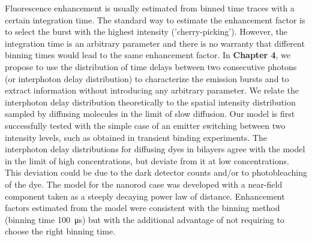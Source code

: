 Fluorescence enhancement is usually estimated from binned time traces with a certain integration time.
The standard way to estimate the enhancement factor is to select the burst with the highest intensity ('cherry-picking').
However, the integration time is an arbitrary parameter and there is no warranty that different binning times would lead to the same enhancement factor.
In \textbf{Chapter 4}, we propose to use the distribution of time delays between two consecutive photons (or interphoton delay distribution) to characterize the emission bursts and to extract information without introducing any arbitrary parameter.
We relate the interphoton delay distribution theoretically to the spatial intensity distribution sampled by diffusing molecules in the limit of slow diffusion.
Our model is first successfully tested with the simple case of an emitter switching between two intensity levels, such as obtained in transient binding experiments.
The interphoton delay distributions for diffusing dyes in bilayers agree with the model in the limit of high concentrations, but deviate from it at low concentrations.
This deviation could be due to the dark detector counts and/or to photobleaching of the dye.
The model for the nanorod case was developed with a near-field component taken as a steeply decaying power law of distance.
Enhancement factors estimated from the model were consistent with the binning method (binning time \SI{100}{\us}) but with the additional advantage of not requiring to choose the right binning time.



